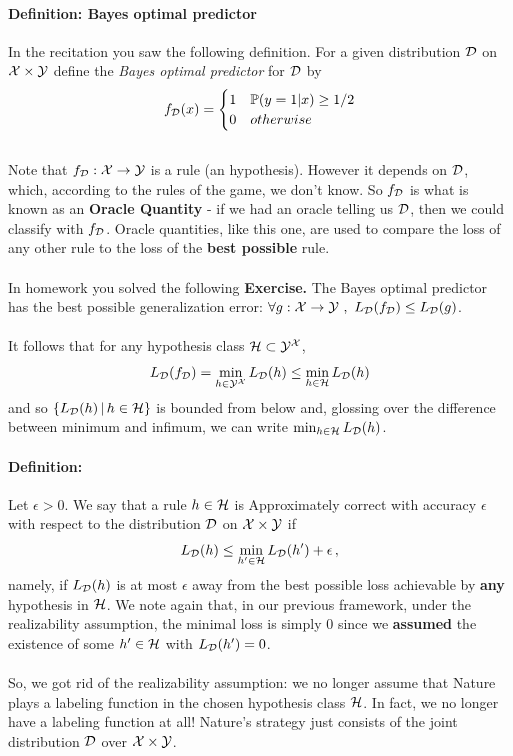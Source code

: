 \paragraph{Definition: Bayes optimal predictor}
In the recitation you saw the following definition.
    For a given distribution $\mathcal{D}$ on $\mathcal{X}\times \mathcal{Y}$ define the {\em Bayes
    optimal predictor} for $\mathcal{D}$ by 
    \[
        f_{\mathcal{D}}(x) = 
        \begin{cases}
            1 & \mathbb{P}(y=1|x)\geq 1/2\\
            0 & otherwise
        \end{cases}
    \]
~\\
Note that $f_{\mathcal{D}}:\mathcal{X}\to\mathcal{Y}$ is a rule (an hypothesis). However it depends on
$\mathcal{D}$, which, according to the rules of the game, we don't know. So $f_{\mathcal{D}}$ is
what is known as an {\bf Oracle Quantity} - if we had an oracle telling us
$\mathcal{D}$, then we could classify with $f_{\mathcal{D}}$. Oracle quantities, like this one,
are used to compare the loss of any other rule to the loss of the {\bf best
possible} rule. 
\\~\\
In homework you solved the following
{\bf Exercise.} The Bayes optimal predictor has the best possible generalization
error: 
$ \forall g:\mathcal{X}\to\mathcal{Y}  \,\,,\,\, L_{\mathcal{D}}(f_{\mathcal{D}})\leq L_{\mathcal{D}}(g) $. 
\\~\\
It follows that for any hypothesis class $\mathcal{H}\subset \mathcal{Y}^{\mathcal{X}}$,
\[
  L_{\mathcal{D}}(f_{\mathcal{D}}) = \min_{h\in \mathcal{Y}^{\mathcal{X}}} L_{\mathcal{D}}(h)  \leq \min_{h\in\mathcal{H}} L_{\mathcal{D}}(h)
\]
and so  $\{L_{\mathcal{D}}(h)\,|\, h\in\mathcal{H}\}$ is bounded from below and, glossing over the
difference between minimum and infimum, we can write $\min_{h\in\mathcal{H}} L_{\mathcal{D}}(h)$.
~\\
\paragraph{Definition:}
Let $\epsilon>0$.
We say that a rule $h\in\mathcal{H}$ is Approximately correct with accuracy $\epsilon$
with respect to the distribution $\mathcal{D}$ on $\mathcal{X}\times \mathcal{Y}$ if 
\[
   L_{\mathcal{D}}(h) \leq  \min_{h'\in\mathcal{H}} L_{\mathcal{D}}(h') + \epsilon\,,
\]
namely, if $L_{\mathcal{D}}(h)$  is at most $\epsilon$ away from the best possible loss
achievable by {\bf any} hypothesis in $\mathcal{H}$. We note again that, in our previous
framework, under the
realizability assumption, the minimal loss is simply $0$ since we {\bf assumed}
the existence of some $h'\in\mathcal{H}$ with $L_{\mathcal{D}}(h')=0$.
\\~\\
So, we got rid of the realizability assumption: we no longer assume that Nature
plays a labeling function in the chosen hypothesis class $\mathcal{H}$. In fact, we no
longer have a labeling function at all! Nature's strategy just consists of the joint
distribution $\mathcal{D}$ over $\mathcal{X}\times \mathcal{Y}$.

